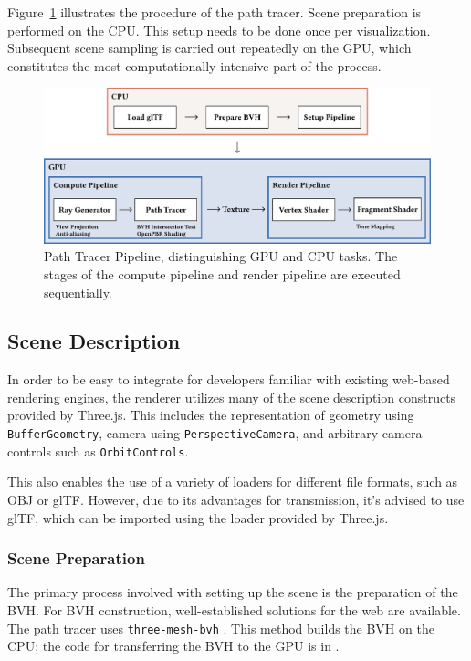 Figure~\ref{fig:path-tracer} illustrates the procedure of the path tracer. Scene preparation is performed on the \gls{CPU}. This setup needs to be done once per visualization. Subsequent scene sampling is carried out repeatedly on the \gls{GPU}, which constitutes the most computationally intensive part of the process.

\begin{figure}[H]
    \includegraphics[width=1.0\columnwidth]{resources/path-tracer-pipeline.png}
    \caption{Path Tracer Pipeline, distinguishing \gls{GPU} and \gls{CPU} tasks. The stages of the compute pipeline and render pipeline are executed sequentially.}
    \label{fig:path-tracer}
\end{figure}

\subsection*{Scene Description}

In order to be easy to integrate for developers familiar with existing web-based rendering engines, the renderer utilizes many of the scene description constructs provided by \gls{Three.js}. This includes the representation of geometry using \texttt{BufferGeometry}, camera using \texttt{PerspectiveCamera}, and arbitrary camera controls such as \texttt{OrbitControls}.

This also enables the use of a variety of loaders for different file formats, such as \gls{OBJ} or \gls{glTF}. However, due to its advantages for transmission, it's advised to use \gls{glTF}, which can be imported using the loader provided by \gls{Three.js}.

\subsubsection{Scene Preparation}

The primary process involved with setting up the scene is the preparation of the \gls{BVH}. For \gls{BVH} construction, well-established solutions for the web are available. The path tracer uses \texttt{three-mesh-bvh} \cite{threeMeshBvh}. This method builds the \gls{BVH} on the \gls{CPU}; the code for transferring the \gls{BVH} to the \gls{GPU} is in .

